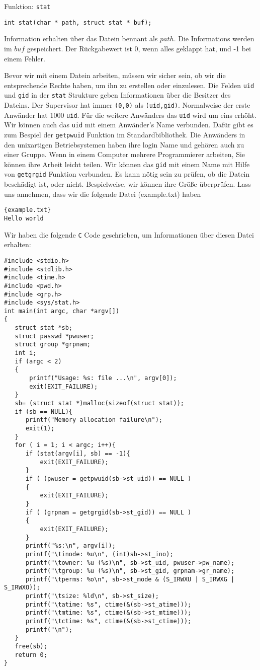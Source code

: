 \begin{myexampleblock}{Funktion: \texttt{stat}}
\begin{lstlisting}
int stat(char * path, struct stat * buf);
\end{lstlisting}
\vspace{-.4cm}
Information erhalten über das Datein bennant als $path$. Die Informations werden im $buf$ gespeichert.
Der Rückgabewert ist 0, wenn alles geklappt hat, und -1 bei einem Fehler.
\end{myexampleblock}
Bevor wir mit einem Datein arbeiten, müssen wir sicher sein, ob wir die entsprechende Rechte haben, um ihn zu 
erstellen oder einzulesen. Die Felden \texttt{uid} und \texttt{gid} in der \texttt{stat} Strukture geben Informationen 
über die Besitzer des Dateins. Der Supervisor hat immer \texttt{(0,0)} als \texttt{(uid,gid)}. Normalweise der erste Anwänder 
hat 1000 \texttt{uid}. Für die weitere Anwänders das \texttt{uid} wird um eins erhöht. 
Wir können auch das \texttt{uid} mit einem Anwänder's Name verbunden. Dafür gibt es zum Bespiel der \texttt{getpwuid} 
Funktion im Standardbibliothek. Die Anwänders in den unixartigen Betriebsystemen haben ihre login Name und gehören
auch zu einer Gruppe. Wenn in einem Computer mehrere Programmierer arbeiten, Sie können ihre Arbeit leicht teilen. 
Wir können das \texttt{gid} mit einem Name mit Hilfe von \texttt{getgrgid} Funktion verbunden.
Es kann nötig sein zu prüfen, ob die Datein beschädigt ist, oder nicht.  Bespielweise, wir können ihre Größe
überprüfen. Lass uns annehmen, dass wir die folgende Datei (example.txt) haben
\begin{lstlisting}{example.txt}
Hello world
\end{lstlisting}
Wir haben die folgende \texttt{C} Code geschrieben, um Informationen über diesen Datei erhalten:
\begin{lstlisting}
#include <stdio.h>
#include <stdlib.h>
#include <time.h>
#include <pwd.h>
#include <grp.h>
#include <sys/stat.h>
int main(int argc, char *argv[])
{
   struct stat *sb;
   struct passwd *pwuser;
   struct group *grpnam;
   int i;
   if (argc < 2)
   {
       printf("Usage: %s: file ...\n", argv[0]);
       exit(EXIT_FAILURE);
   }
   sb= (struct stat *)malloc(sizeof(struct stat));
   if (sb == NULL){
      printf("Memory allocation failure\n");
      exit(1);
   }
   for ( i = 1; i < argc; i++){
      if (stat(argv[i], sb) == -1){
          exit(EXIT_FAILURE);
      }
      if ( (pwuser = getpwuid(sb->st_uid)) == NULL )
      {
          exit(EXIT_FAILURE);
      }
      if ( (grpnam = getgrgid(sb->st_gid)) == NULL )
      {
          exit(EXIT_FAILURE);
      }
      printf("%s:\n", argv[i]);
      printf("\tinode: %u\n", (int)sb->st_ino);
      printf("\towner: %u (%s)\n", sb->st_uid, pwuser->pw_name);
      printf("\tgroup: %u (%s)\n", sb->st_gid, grpnam->gr_name);
      printf("\tperms: %o\n", sb->st_mode & (S_IRWXU | S_IRWXG | S_IRWXO));
      printf("\tsize: %ld\n", sb->st_size);
      printf("\tatime: %s", ctime(&(sb->st_atime)));
      printf("\tmtime: %s", ctime(&(sb->st_mtime)));
      printf("\tctime: %s", ctime(&(sb->st_ctime)));
      printf("\n");
   }
   free(sb);
   return 0;
}
\end{lstlisting}
